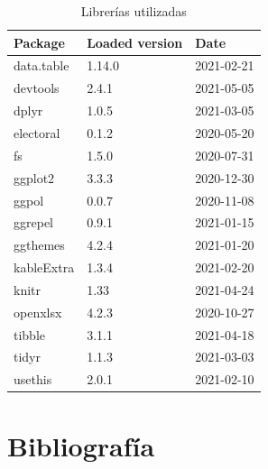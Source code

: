 \documentclass[12pt,a4paper,]{book}
\def\ifdoblecara{} %
\def\ifcitapandoc{} %
\let\ifcitapandoc\undefined %
\numberwithin{dummy}{section}
\theoremstyle{ocrenumbox}
\theoremstyle{blacknumex}
\theoremstyle{blacknumbox}
\theoremstyle{ocrenum}
\theoremstyle{ocrenum}
\begin{document}
\begin{table}[!h]

\caption[ ]{\label{tab:Reproducibility-SessionInfo-R-packages}Librerías utilizadas}
\centering
\begin{tabular}[t]{lll}
\toprule
Package & Loaded version & Date\\
\midrule
data.table & 1.14.0 & 2021-02-21\\
devtools & 2.4.1 & 2021-05-05\\
dplyr & 1.0.5 & 2021-03-05\\
electoral & 0.1.2 & 2020-05-20\\
fs & 1.5.0 & 2020-07-31\\
\addlinespace
ggplot2 & 3.3.3 & 2020-12-30\\
ggpol & 0.0.7 & 2020-11-08\\
ggrepel & 0.9.1 & 2021-01-15\\
ggthemes & 4.2.4 & 2021-01-20\\
kableExtra & 1.3.4 & 2021-02-20\\
\addlinespace
knitr & 1.33 & 2021-04-24\\
openxlsx & 4.2.3 & 2020-10-27\\
tibble & 3.1.1 & 2021-04-18\\
tidyr & 1.1.3 & 2021-03-03\\
usethis & 2.0.1 & 2021-02-10\\
\bottomrule
\end{tabular}
\end{table}
\renewcommand{\arraystretch}{1}

\FloatBarrier
\cleardoublepage

\ifdefined\ifdoblecara
  \fancyhead[LE,RO]{}
  \fancyfoot[LO,RE]{}
\else
  \fancyhead[RO]{}
  \fancyfoot[LO]{}
\fi

\ifdefined\ifcitapandoc

\hypertarget{bibliografuxeda}{%
\chapter*{Bibliografía}\label{bibliografuxeda}}

\else

\nocite{*}

\fi




\end{document}
